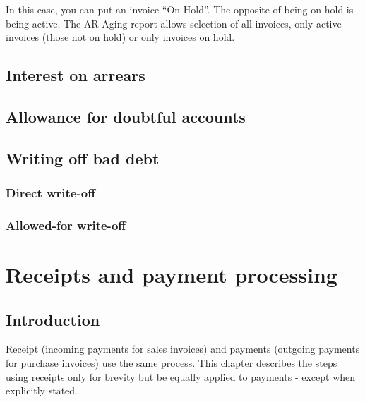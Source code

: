 In this case, you can put an invoice ``On Hold''. The opposite of being on hold is
being active. The AR Aging report allows selection of all invoices, only active
invoices (those not on hold) or only invoices on hold.


\section{Interest on arrears}
\label{sec-business-processes-credit-risk-interest-on-arrears}

\section{Allowance for doubtful accounts}
\label{sec-business-processes-credit-risk-allowance-doubtful-accounts}


\section{Writing off bad debt}
\label{sec-business-processes-credit-risk-bad-debt-write-off}

\subsection{Direct write-off}
\label{sec-business-processes-credit-risk-bad-debt-direct-write-off}

\subsection{Allowed-for write-off}
\label{sec-business-processes-credit-risk-bad-debt-allowed-write-off}

\chapter{Receipts and payment processing}
\label{cha-business-processes-payment-processing}

\section{Introduction}
\label{sec-business-processes-payment-processing-introduction}

Receipt (incoming payments for sales invoices) and payments (outgoing payments
for purchase invoices) use the same process. This chapter describes the steps
using receipts only for brevity but be equally applied to payments - except
when explicitly stated.


